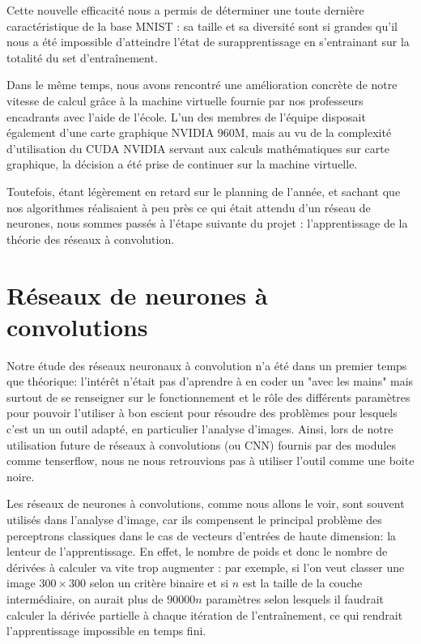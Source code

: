 \documentclass[
    10pt,
    a4paper,
    oneside,
    headinclude,footinclude,
    BCOR=5mm,
    captions=tableabove
]{scrartcl}
\begin{document}
Cette nouvelle efficacité nous a permis de déterminer une toute dernière caractéristique de la base MNIST : sa taille et sa diversité sont si grandes qu'il nous a été impossible d'atteindre l'état de surapprentissage en s'entrainant sur la totalité du set d'entraînement.

Dans le même temps, nous avons rencontré une amélioration concrète de notre vitesse de calcul grâce à la machine virtuelle fournie par nos professeurs encadrants avec l'aide de l'école. L'un des membres de l'équipe disposait également d'une carte graphique NVIDIA 960M, mais au vu de la complexité d'utilisation du CUDA NVIDIA servant aux calculs mathématiques sur carte graphique, la décision a été prise de continuer sur la machine virtuelle.

Toutefois, étant légèrement en retard sur le planning de l'année, et sachant que nos algorithmes réalisaient à peu près ce qui était attendu d'un réseau de neurones, nous sommes passés à l'étape suivante du projet : l'apprentissage de la théorie des réseaux à convolution.

\newpage
\section{Réseaux de neurones à convolutions}

Notre étude des réseaux neuronaux à convolution n'a été dans un premier temps que théorique: l'intérêt n'était pas d'aprendre à en coder un "avec les mains" mais surtout de se renseigner sur le fonctionnement et le rôle des différents paramètres pour pouvoir l'utiliser à bon escient pour résoudre des problèmes pour lesquels c'est un un outil adapté, en particulier l'analyse d'images. Ainsi, lors de notre utilisation future de réseaux à convolutions (ou CNN) fournis par des modules comme tenserflow, nous ne nous retrouvions pas à utiliser l'outil comme une boite noire.

Les réseaux de neurones à convolutions, comme nous allons le voir, sont souvent utilisés dans l'analyse d'image, car ils compensent le principal problème des perceptrons classiques dans le cas de vecteurs d'entrées de haute dimension: la lenteur de l'apprentissage. En effet, le nombre de poids et donc le nombre de dérivées à calculer va vite trop augmenter : par exemple, si l'on veut classer une image $300\times300$ selon un critère binaire et si $n$ est la taille de la couche intermédiaire, on aurait plus de $90000 n$ paramètres selon lesquels il faudrait calculer la dérivée partielle à chaque itération de l'entraînement, ce qui rendrait l'apprentissage impossible en temps fini. 
\end{document}
